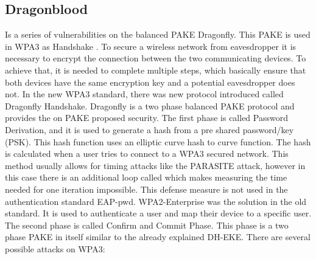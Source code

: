 \documentclass[journal]{IEEEtran}
\begin{document}
\subsection{Dragonblood}
Is a series of vulnerabilities on the balanced PAKE Dragonfly. This PAKE is used in WPA3 as Handshake \cite{wifi2020wpa3}. 
To secure a wireless network from eavesdropper it is necessary to encrypt the connection between the two communicating devices.
To achieve that, it is needed to complete multiple steps, which basically ensure that both devices have the same encryption key and a potential eavesdropper does not.
In the new WPA3 standard, there was new protocol introduced called Dragonfly Handshake. Dragonfly is a two phase balanced PAKE protocol and provides the on PAKE proposed security.
The first phase is called Password Derivation, and it is used to generate a hash from a pre shared password/key (PSK). This hash function uses an elliptic curve hash to curve function. The hash is calculated when a user tries to connect to a WPA3 secured network. %
This method usually allows for timing attacks like the PARASITE attack, however in this case there is an additional loop called which makes measuring the time needed for one iteration impossible.
This defense measure is not used in the authentication standard EAP-pwd. WPA2-Enterprise was the solution in the old standard. It is used to authenticate a user and map their device to a specific user.
The second phase is called Confirm and Commit Phase. This phase is a two phase PAKE in itself similar to the already explained DH-EKE. There are several possible attacks on WPA3: 
\end{document}
